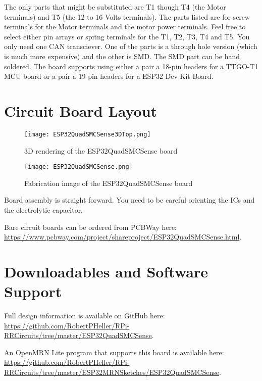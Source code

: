 The only parts that might be substituted are T1 though T4 (the Motor
terminals) and T5 (the 12 to 16 Volts terminals). The parts listed are for
screw terminals for the Motor terminals and the motor power terminals. Feel
free to select either pin arrays or spring terminals for the T1, T2, T3, T4
and T5. You only need one CAN transciever. One of the parts is a through hole
version (which is much more expensive) and the other is SMD. The SMD part can
be hand soldered. The board supports using either a pair a 18-pin headers for
a TTGO-T1 MCU board or a pair a 19-pin headers for a ESP32 Dev Kit Board.

\section{Circuit Board Layout}

\begin{figure}[hbpt]\begin{centering}%
\texttt{[image: ESP32QuadSMCSense3DTop.png]}
\caption{3D rendering of the ESP32QuadSMCSense board}
\end{centering}\end{figure}
\begin{figure}[hbpt]\begin{centering}%
\texttt{[image: ESP32QuadSMCSense.png]}
\caption{Fabrication image of the ESP32QuadSMCSense board}
\end{centering}\end{figure}
Board assembly is straight forward. You need to be careful orienting the ICs
and the electrolytic capacitor.

Bare circuit boards can be ordered from PCBWay here: 
\url{https://www.pcbway.com/project/shareproject/ESP32QuadSMCSense.html}.

\section{Downloadables and Software Support}

Full design information is available on GitHub here:
\url{https://github.com/RobertPHeller/RPi-RRCircuits/tree/master/ESP32QuadSMCSense}.

An OpenMRN Lite program that supports this board is available here:
\url{https://github.com/RobertPHeller/RPi-RRCircuits/tree/master/ESP32MRNSketches/ESP32QuadSMCSense}.



